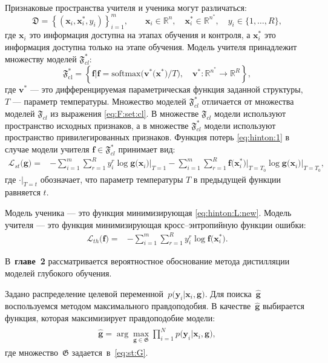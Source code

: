 \documentclass{dissert}
\begin{document}
Признаковые пространства учителя и ученика могут различаться:
\[
    \mathfrak{D} = \left\{\left(\mathbf{x}_i, \mathbf{x}^*_i, y_i\right)\right\}_{i=1}^{m}, \qquad \mathbf{x}_i \in \mathbb{R}^{n}, \quad \mathbf{x}^*_i \in \mathbb{R}^{n^*}, \quad y_i \in \{1, \ldots, R\},
\]
где $\mathbf{x}_i$ это информация доступна на этапах обучения и контроля, а $\mathbf{x}^*_i$ это информация доступна только на этапе обучения. Модель учителя принадлежит множеству моделей $\mathfrak{F}_{cl}^*$:
\[
\label{eq:F:set:cl:priv}
\mathfrak{F}_{\text{cl}}^* = \left\{\mathbf{f}| \mathbf{f} = \text{softmax}\bigr(\mathbf{v}^*\bigr(\mathbf{x}^*\bigr)/T\bigr), \quad \mathbf{v}^*: \mathbb{R}^{n^*} \to \mathbb{R}^R \right\},
\]
где $\mathbf{v}^*$ --- это дифференцируемая параметрическая функция заданной структуры, $T$ --- параметр температуры. Множество моделей $\mathfrak{F}_{cl}^*$ отличается от множества моделей $\mathfrak{F}_{cl}$ из выражения \eqref{eq:F:set:cl}. В множестве $\mathfrak{F}_{cl}$ модели используют пространство исходных признаков, а в множестве $\mathfrak{F}_{cl}^*$ модели используют пространство привилегированных признаков. Функция потерь \eqref{eq:hinton:1} в случае модели учителя $\mathbf{f} \in \mathfrak{F}_{cl}^*$ принимает вид:
\[
\label{eq:hinton:L:new}
\begin{aligned}
   \mathcal{L}_{st}\bigr(\mathbf{g}\bigr) = &-\sum_{i=1}^{m}{\sum_{r=1}^{R}y^r_i\log\mathbf{g}\bigr(\mathbf{x}_i\bigr)\bigr|_{T=1}}-\sum_{i=1}^{m}{\sum_{r=1}^{R}\mathbf{f}\bigr(\mathbf{x}^*_i\bigr)\bigr|_{T=T_0}\log\mathbf{g}\bigr(\mathbf{x}_i\bigr)\bigr|_{T=T_0}},
\end{aligned}
\]
где $\cdot\bigr|_{T=t}$ обозначает, что параметр температуры $T$ в предыдущей функции равняется $t$.

Модель ученика --- это функция минимизирующая \eqref{eq:hinton:L:new}. Модель учителя --- это функция минимизирующая кросс--энтропийную функции ошибки:
\[
\label{eq:hinton.2}
\begin{aligned}
   \mathcal{L}_{th}\bigr(\mathbf{f}\bigr) = &-\sum_{i=1}^{m}{{\sum_{r=1}^{R}y^r_i\log\mathbf{f}\bigr(\mathbf{x}^*_i\bigr)}}.
   \end{aligned}
\]

В~\textbf{главе~2} рассматривается вероятностное обоснование метода дистилляции моделей глубокого обучения.

Задано распределение целевой переменной~$p\bigr(\mathbf{y}_i|\mathbf{x}_i, \mathbf{g}\bigr)$.
Для поиска~$\hat{\mathbf{g}}$ воспользуемся методом максимального правдоподобия. В качестве~$\hat{\mathbf{g}}$ выбирается функция, которая максимизирует правдоподобие модели:
\begin{gather}
\label{ch-2:eq:st:7}
\begin{aligned}
\hat{\mathbf{g}} = \arg\max_{\mathbf{g}\in \mathfrak{G}} \prod_{i=1}^{N}p\bigr(\mathbf{y}_{i}|\mathbf{x}_i, \mathbf{g}\bigr),
\end{aligned}
\end{gather}
где множество~$\mathfrak{G}$ задается~в~\eqref{eq:st:G}.
\end{document}
